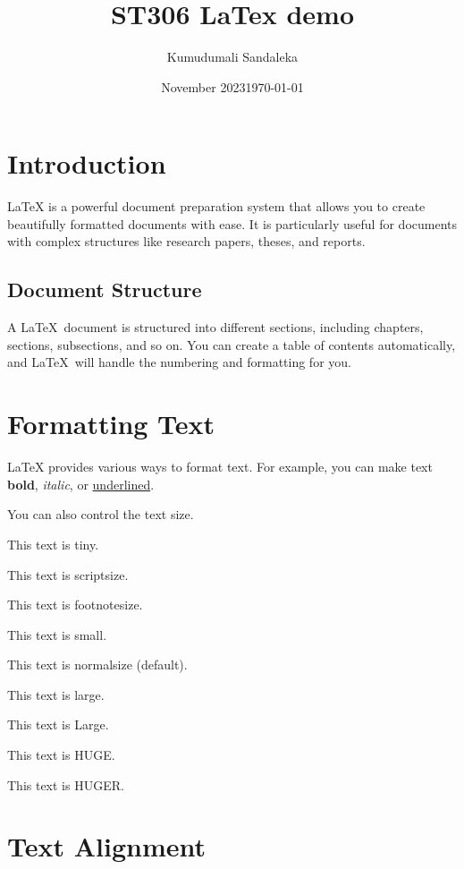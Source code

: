 \documentclass{article}
\title{ST306 LaTex demo}
\author{Kumudumali Sandaleka}
\date{November 2023}
\date{\today}
\begin{document}
\maketitle

\section{Introduction}

LaTeX is a powerful document preparation system that allows you to create beautifully formatted documents with ease. It is particularly useful for documents with complex structures like research papers, theses, and reports.

\subsection{Document Structure}
A \LaTeX\, document is structured into different sections, including chapters, sections, subsections, and so on. You can create a table of contents automatically, and \LaTeX\,  will handle the numbering and formatting for you.



\section{Formatting Text}

LaTeX provides various ways to format text. For example, you can make text \textbf{bold}, \textit{italic}, or \underline{underlined}.

You can also control the text size.

{\tiny This text is tiny.} 

{\scriptsize This text is scriptsize.}

{\footnotesize This text is footnotesize.}

{\small This text is small.}

{\normalsize This text is normalsize (default).}

{\large This text is large.}

{\Large This text is Large.}

{\huge This text is HUGE.}

{\Huge This text is HUGER.}

\newpage
\section{Text Alignment}
\end{document}
